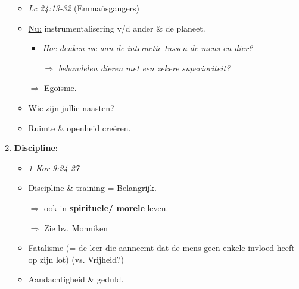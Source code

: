 \begin{enumerate}
	\begin{itemize}
		\item \textit{Lc 24:13-32} (Emma\"usgangers)
		\item \underline{Nu:} instrumentalisering v/d ander \&	de planeet.
		\begin{itemize}
			\item \textit{Hoe denken we aan de interactie tussen de mens en dier?}
			\item[$\Rightarrow$] \textit{behandelen dieren met een zekere superioriteit?} 
		\end{itemize}
		\item[$\Rightarrow$] Ego\"isme.
		\item Wie zijn jullie naasten?		
		\item Ruimte \& openheid cre\"eren.
	\end{itemize}
	\item \textbf{Discipline}:
	\begin{itemize}
		\item \textit{1 Kor 9:24-27}
		\item Discipline \& training = Belangrijk.
		\item[$\Rightarrow$] ook in \textbf{spirituele/ morele} leven.
		\item[$\Rightarrow$] Zie bv. Monniken
		\item Fatalisme (= de leer die aanneemt dat de mens geen enkele invloed heeft op zijn lot) (vs. Vrijheid?)
		\item Aandachtigheid \& geduld.
	\end{itemize}
\end{enumerate}
